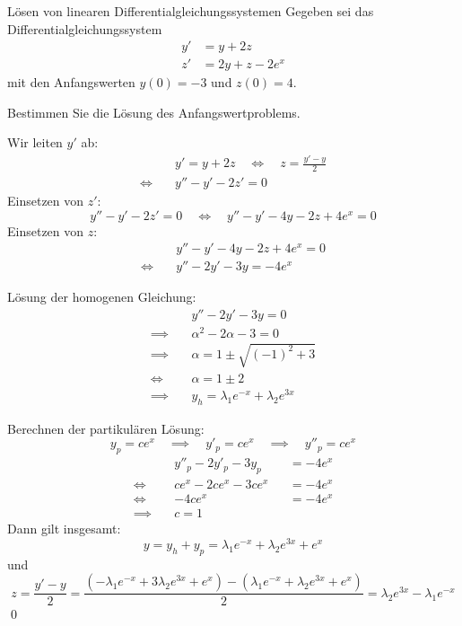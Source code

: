 \documentclass[german]{../spicker}
\begin{document}
\begin{example}{Lösen von linearen Differentialgleichungssystemen}
    Gegeben sei das Differentialgleichungssystem
    $$
        \begin{aligned}
            y' & = y + 2z          \\
            z' & = 2y + z - 2e^{x}
        \end{aligned}
    $$
    mit den Anfangswerten $y(0) = -3$ und $z(0) = 4$.

    Bestimmen Sie die Lösung des Anfangswertproblems.

    \noindent\makebox[\linewidth]{\rule{\textwidth}{1pt}}

    Wir leiten $y'$ ab:
    $$
        \begin{aligned}
                       & y' = y + 2z \quad \iff \quad z = \frac{y'- y}{2} \\
            \iff \quad & y'' - y'  - 2z' = 0
        \end{aligned}
    $$
    Einsetzen von $z'$:
    $$
        y'' - y'  - 2z' = 0 \quad \iff \quad  y'' - y'  - 4y -2z + 4e^{x} = 0
    $$
    Einsetzen von $z$:
    $$
        \begin{aligned}
                       & y'' - y'  - 4y -2z + 4e^{x} = 0 \\
            \iff \quad & y'' - 2y'  - 3y  = -4e^{x}
        \end{aligned}
    $$

    Lösung der homogenen Gleichung:
    $$
        \begin{aligned}
                           & y'' - 2y'  - 3y  = 0                          \\
            \implies \quad & \alpha^2 - 2\alpha - 3 = 0                    \\
            \implies \quad & \alpha = 1 \pm \sqrt{\left( -1 \right)^2 + 3} \\
            \iff \quad     & \alpha = 1 \pm 2                              \\
            \implies \quad & y_h = \lambda_1e^{-x} + \lambda_2e^{3x}
        \end{aligned}
    $$

    Berechnen der partikulären Lösung:
    $$
        y_p = ce^x \quad \implies \quad y'_p = ce^x \quad \implies \quad y''_p = ce^x
    $$
    $$
        \begin{aligned}
                           & y''_p - 2y'_p  - 3y_p &  & = -4e^{x} \\
            \iff \quad     & ce^x - 2ce^x  - 3ce^x &  & = -4e^{x} \\
            \iff \quad     & -4ce^x                &  & = -4e^{x} \\
            \implies \quad & c = 1
        \end{aligned}
    $$
    Dann gilt insgesamt:
    $$
        y = y_h + y_p = \lambda_1e^{-x} + \lambda_2e^{3x} + e^x
    $$
    und
    $$
        z = \frac{y'- y}{2} = \frac{\left( -\lambda_1e^{-x} + 3\lambda_2e^{3x} + e^x \right) - \left( \lambda_1e^{-x} + \lambda_2e^{3x} + e^x \right)}{2} = \lambda_2e^{3x} - \lambda_1e^{-x}
    $$\qed
\end{example}

\printindex
\printindex[Beispiele]
\end{document}

